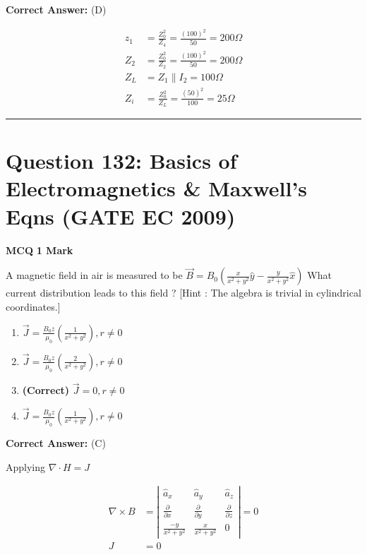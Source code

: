\documentclass[11pt,a4paper]{article}
\begin{document}
\noindent \textbf{Correct Answer:} (D)

\begin{tcolorbox}[solbox, title=Detailed Solution -- Question 131]
\[
\begin{aligned} z_{1}&=\frac{Z_{0}^{2}}{Z_{4}}=\frac{(100)^{2}}{50}=200 \Omega \\ Z_{2}&=\frac{Z_{0}^{2}}{Z_{2}}=\frac{(100)^{2}}{50}=200 \Omega \\ Z_{L}&=Z_{1} \| I_{2}=100 \Omega \\ Z_{i}&=\frac{Z_{0}^{2}}{Z_{L}}=\frac{(50)^{2}}{100}=25 \Omega \end{aligned}
\]
\end{tcolorbox}

\vspace{1.5em}
\hrule
\vspace{1.5em}

\section*{Question 132: Basics of Electromagnetics \& Maxwell's Eqns (GATE EC 2009)}
\noindent \textbf{\color{primary}MCQ} \hfill \textbf{\color{secondary}1 Mark}


\noindent A magnetic field in air is measured to be 
 $\vec{B}=B_{0}(\frac{x}{x^{2}+y^{2}}\hat{y}-\frac{y}{x^{2}+y^{2}}\hat{x})$ 
What current distribution leads to this field ?
[Hint : The algebra is trivial in cylindrical coordinates.]


\begin{enumerate}[label=(\Alph*)]
    \item $\vec{J}=\frac{B_{0}\hat{z}}{\mu _{0}}(\frac{1}{x^{2}+y^{2}}),r\neq 0$
    \item $\vec{J}=\frac{B_{0}\hat{z}}{\mu _{0}}(\frac{2}{x^{2}+y^{2}}),r\neq 0$
    \item \textbf{(Correct)} $\vec{J}=0,r\neq 0$
    \item $\vec{J}=\frac{B_{0}\hat{z}}{\mu _{0}}(\frac{1}{x^{2}+y^{2}}),r\neq 0$
\end{enumerate}

\noindent \textbf{Correct Answer:} (C)

\begin{tcolorbox}[solbox, title=Detailed Solution -- Question 132]
Applying $\nabla \cdot H=J$

\[
\begin{aligned} \nabla \times B&=\left|\begin{array}{ccc} \hat{a}_{x} & \hat{a}_{y} & \hat{a}_{z} \\ \frac{\partial}{\partial x} & \frac{\partial}{\partial y} & \frac{\partial}{\partial z} \\ \frac{-y}{x^{2}+y^{2}} & \frac{x}{x^{2}+y^{2}} & 0 \end{array}\right|=0 \\ J&=0 \end{aligned}
\]
\end{tcolorbox}
\end{document}
